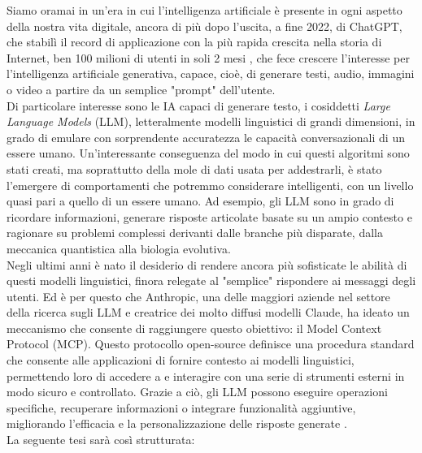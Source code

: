 ﻿Siamo oramai in un'era in cui l'intelligenza artificiale è presente in ogni aspetto della nostra vita digitale,
ancora di più dopo l'uscita, a fine 2022, di ChatGPT, che stabilì il record di applicazione con la più rapida crescita nella storia di Internet,
ben 100 milioni di utenti in soli 2 mesi \cite{ubs2023latest}, che fece crescere l'interesse per l'intelligenza
artificiale generativa, capace, cioè, di generare testi, audio, immagini o video a partire da un semplice "prompt" dell'utente. \\
Di particolare interesse sono le IA capaci di generare testo, i cosiddetti \textit{Large Language Models} (LLM), letteralmente modelli linguistici
di grandi dimensioni, in grado di emulare con sorprendente accuratezza le capacità conversazionali di un essere umano. Un'interessante
conseguenza del modo in cui questi algoritmi sono stati creati, ma soprattutto della mole di dati usata per addestrarli, è stato l'emergere
di comportamenti che potremmo considerare intelligenti, con un livello quasi pari a quello di un essere umano. Ad esempio, gli LLM sono
in grado di ricordare informazioni, generare risposte articolate basate su un ampio contesto e ragionare su problemi complessi derivanti
dalle branche più disparate, dalla meccanica quantistica alla biologia evolutiva. \\
Negli ultimi anni è nato il desiderio di rendere ancora più sofisticate le abilità di questi modelli linguistici, finora relegate al
"semplice" rispondere ai messaggi degli utenti. Ed è per questo che Anthropic, una delle maggiori aziende nel settore della ricerca sugli LLM
e creatrice dei molto diffusi modelli Claude, ha ideato un meccanismo che consente di raggiungere questo obiettivo: il Model Context Protocol (MCP).
Questo protocollo open-source definisce una procedura standard che consente alle applicazioni di fornire contesto ai modelli linguistici,
permettendo loro di accedere a e interagire con una serie di strumenti esterni in modo sicuro e controllato. Grazie a ciò, gli LLM possono
eseguire operazioni specifiche, recuperare informazioni o integrare funzionalità aggiuntive, migliorando l'efficacia e la personalizzazione
delle risposte generate \cite{modelcontextprotocol2024}. \\
La seguente tesi sarà così strutturata:
